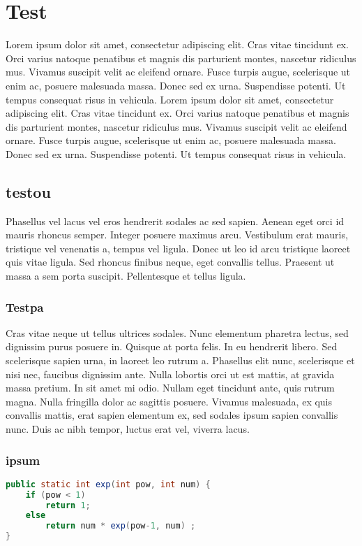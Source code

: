 \documentclass{core/report-template}
\begin{document}

\tableofcontents
\newpage
\section{Test}
Lorem ipsum dolor sit amet, consectetur adipiscing elit. Cras vitae tincidunt ex. Orci varius natoque penatibus et magnis dis parturient montes, nascetur ridiculus mus. Vivamus suscipit velit ac eleifend ornare. Fusce turpis augue, scelerisque ut enim ac, posuere malesuada massa. Donec sed ex urna. Suspendisse potenti. Ut tempus consequat risus in vehicula.
Lorem ipsum dolor sit amet, consectetur adipiscing elit. Cras vitae tincidunt ex. Orci varius natoque penatibus et magnis dis parturient montes, nascetur ridiculus mus. Vivamus suscipit velit ac eleifend ornare. Fusce turpis augue, scelerisque ut enim ac, posuere malesuada massa. Donec sed ex urna. Suspendisse potenti. Ut tempus consequat risus in vehicula.

\subsection{testou}
Phasellus vel lacus vel eros hendrerit sodales ac sed sapien. Aenean eget orci id mauris rhoncus semper. Integer posuere maximus arcu. Vestibulum erat mauris, tristique vel venenatis a, tempus vel ligula. Donec ut leo id arcu tristique laoreet quis vitae ligula. Sed rhoncus finibus neque, eget convallis tellus. Praesent ut massa a sem porta suscipit. Pellentesque et tellus ligula.

\subsubsection{Testpa}
Cras vitae neque ut tellus ultrices sodales. Nunc elementum pharetra lectus, sed dignissim purus posuere in. Quisque at porta felis. In eu hendrerit libero. Sed scelerisque sapien urna, in laoreet leo rutrum a. Phasellus elit nunc, scelerisque et nisi nec, faucibus dignissim ante. Nulla lobortis orci ut est mattis, at gravida massa pretium. In sit amet mi odio. Nullam eget tincidunt ante, quis rutrum magna. Nulla fringilla dolor ac sagittis posuere. Vivamus malesuada, ex quis convallis mattis, erat sapien elementum ex, sed sodales ipsum sapien convallis nunc. Duis ac nibh tempor, luctus erat vel, viverra lacus. 

\subsubsection{ipsum}
\begin{lstlisting}[language=Java,caption=Some Java code ]
    public static int exp(int pow, int num) {
    if (pow < 1) 
        return 1; 
    else
        return num * exp(pow-1, num) ;
}
\end{lstlisting}

\end{document}
